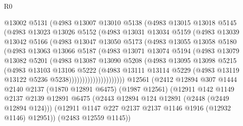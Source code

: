 \begin{lexlean}{R0}
\begin{coremodule}
                @13002
                @5131
                (@4983
                  @13007
                  @13010
                  @5138
                  (@4983
                    @13015
                    @13018
                    @5145
                    (@4983
                      @13023
                      @13026
                      @5152
                      (@4983
                        @13031
                        @13034
                        @5159
                        (@4983
                          @13039
                          @13042
                          @5166
                          (@4983
                            @13047
                            @13050
                            @5173
                            (@4983
                              @13055
                              @13058
                              @5180
                              (@4983
                                @13063
                                @13066
                                @5187
                                (@4983
                                  @13071
                                  @13074
                                  @5194
                                  (@4983
                                    @13079
                                    @13082
                                    @5201
                                    (@4983
                                      @13087
                                      @13090
                                      @5208
                                      (@4983
                                        @13095
                                        @13098
                                        @5215
                                        (@4983
                                          @13103
                                          @13106
                                          @5222
                                          (@4983
                                            @13111
                                            @13114
                                            @5229
                                            (@4983 @13119 @13122 @5236 @5238)))))))))))))))))))))
    @12561
    (@2412
      @12894
      @307
      @1444
      @2140
      @2137
      (@1870 @12891 @6475)
      (@1987 @12561)
      (@12911
        @142
        @1149
        @2137
        @2139
        @12891
        @6475
        (@2443 @12894 @124 @12891 (@2448 (@2449 @12894 @124)))
        (@12911 @1147 @227 @2137 @2137 @1146 @1916 (@12932 @1146) @12951))
      (@2483 @12559 @1145))

\end{coremodule}
\end{lexlean}
